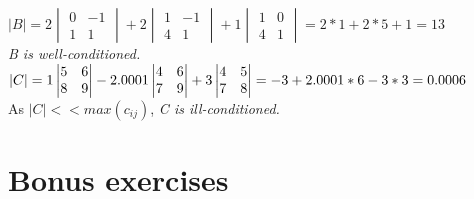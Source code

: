 \documentclass[12pt]{article}
\newenvironment{exercise}[2][Exercise]{\begin{trivlist}
\item[\hskip \labelsep {\bfseries #1}\hskip \labelsep {\bfseries #2.}]}{\end{trivlist}}
\begin{document}
\begin{exercise}{1}
$
\vert B \vert = 2
\begin{vmatrix}
0&-1 \\ 1&1
\end{vmatrix} + 2
\begin{vmatrix}
1&-1 \\ 4&1
\end{vmatrix} + 1
\begin{vmatrix}
1&0\\4&1
\end{vmatrix}=2*1+2*5+1=13
$ \\

\textit{B is well-conditioned.} \\

$
\vert C \vert = 1
\begin{vmatrix}
5&6 \\ 8&9
\end{vmatrix} - 2.0001
\begin{vmatrix}
4&6 \\ 7&9
\end{vmatrix} + 3
\begin{vmatrix}
4&5 \\ 7&8
\end{vmatrix} = -3 + 2.0001*6 - 3*3 = 0.0006 \\
$ \\

As $\vert C \vert << max(c_{ij})$, \textit{C is ill-conditioned.} \\
\end{exercise}

\section{Bonus exercises}
\end{document}
